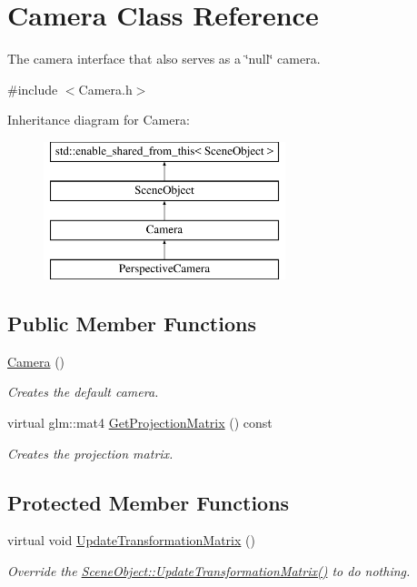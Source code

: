 \hypertarget{class_camera}{}\section{Camera Class Reference}
\label{class_camera}


The camera interface that also serves as a \char`\"{}null\char`\"{} camera.




{\ttfamily \#include $<$Camera.\+h$>$}

Inheritance diagram for Camera\+:\begin{figure}[H]
\begin{center}
\leavevmode
\includegraphics[height=4.000000cm]{class_camera}
\end{center}
\end{figure}
\subsection*{Public Member Functions}
\begin{DoxyCompactItemize}
\item
\hyperlink{class_camera_a01f94c3543f56ede7af49dc778f19331}{Camera} ()
\begin{DoxyCompactList}\small\item\em Creates the default camera. \end{DoxyCompactList}\item
virtual glm\+::mat4 \hyperlink{class_camera_af6f4415189deaff158ba86f0b3527a30}{Get\+Projection\+Matrix} () const
\begin{DoxyCompactList}\small\item\em Creates the projection matrix. \end{DoxyCompactList}\end{DoxyCompactItemize}
\subsection*{Protected Member Functions}
\begin{DoxyCompactItemize}
\item
virtual void \hyperlink{class_camera_aea640c892a3807671d8ca49616d96eda}{Update\+Transformation\+Matrix} ()
\begin{DoxyCompactList}\small\item\em Override the \hyperlink{class_scene_object_a20e31da3f9d2765de50cdb2d637ae6c9}{Scene\+Object\+::\+Update\+Transformation\+Matrix()} to do nothing. \end{DoxyCompactList}\end{DoxyCompactItemize}
